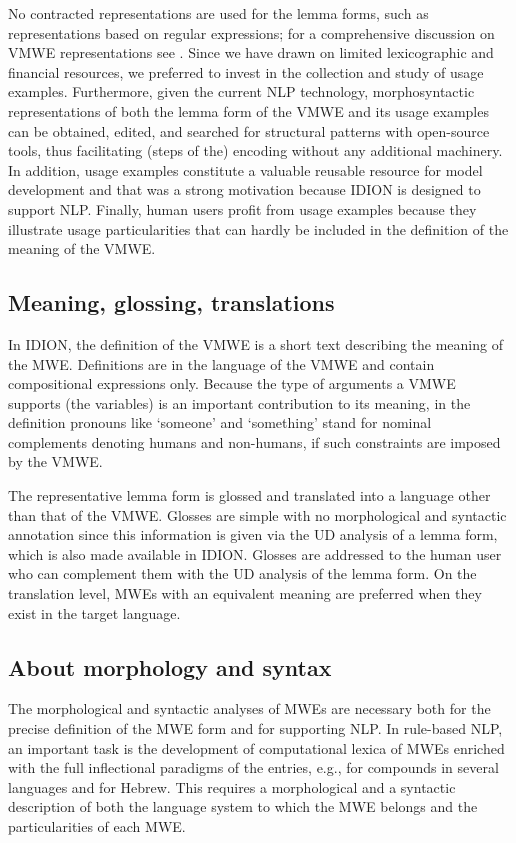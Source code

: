 \documentclass[output=paper,colorlinks,citecolor=brown]{langscibook}
\begin{document}
No contracted representations are used for the lemma forms, such as representations based on regular expressions; for a comprehensive discussion on VMWE representations see \citet{lichteagata}.  
Since we have drawn on limited lexicographic and financial resources, we preferred to invest in the collection and study of usage examples. Furthermore, given the current NLP technology,   morphosyntactic representations of both the lemma form of the VMWE and its usage examples can be obtained, edited, and searched for structural patterns with open-source tools, thus facilitating (steps of the) encoding without any additional machinery. In addition, usage examples constitute a valuable reusable resource for model development and that was a strong motivation because IDION is designed to support NLP. Finally, human users profit from usage examples because they illustrate usage particularities that can hardly be included in the definition of the meaning of the VMWE.


\subsection{Meaning, glossing, translations}
\label{sec:desmeaning}

In IDION, the definition of the VMWE  is a short text describing the meaning of the MWE.   Definitions are in the language of the VMWE and contain compositional expressions only. Because the type of arguments a VMWE supports (the variables) is an important contribution to its meaning, in the definition pronouns like `someone' and `something' stand for nominal complements denoting humans and non-humans, if such constraints are imposed by the VMWE.

The representative lemma form  is glossed and translated into a language other than that of the VMWE. Glosses  are simple with no morphological and syntactic annotation since this information is given via the UD analysis of a lemma form, which is also made available in IDION. Glosses  are addressed to the human user who can complement them with the UD analysis of the lemma form. On the translation level, MWEs with an equivalent meaning are preferred when they exist in the target language.

\subsection{About morphology and syntax}
\label{sec:morphosyntax}

The morphological and syntactic analyses of MWEs are necessary both for the precise definition of the  MWE form and for supporting NLP. In rule-based NLP, an important task is the development of computational lexica of MWEs enriched with the full inflectional paradigms of the entries, e.g.,  \citet{agatamultiflex} for compounds in several languages and \citet{shuly2013} for Hebrew. This requires a morphological and a syntactic description of both the language system to which the MWE belongs and the particularities of each MWE.  
\end{document}
